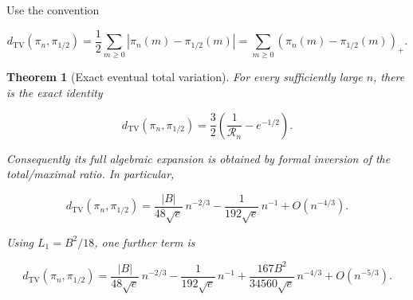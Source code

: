 \documentclass[11pt,letterpaper]{article}
\newtheorem{theorem}{Theorem}[section]
\theoremstyle{remark}
\begin{document}
Use the convention

\[
 d_{\mathrm{TV}}(\pi_n,\pi_{1/2})=\frac12\sum_{m\ge0}|\pi_n(m)-\pi_{1/2}(m)|
                       =\sum_{m\ge0}(\pi_n(m)-\pi_{1/2}(m))_+.
                                                               \tag{D6}\label{tcn:b:D6}
\]

\begin{theorem}[Exact eventual total variation]\label{tcn:b:thm:tv}
For every sufficiently large \(n\), there is the exact
identity

\[
 d_{\mathrm{TV}}(\pi_n,\pi_{1/2})
 =\frac32\left(\frac1{\mathcal R_n}-e^{-1/2}\right).                   \tag{D7}\label{tcn:b:D7}
\]

Consequently its full algebraic expansion is obtained by formal
inversion of the total/maximal ratio. In particular,

\[
 \boxed{\displaystyle
 d_{\mathrm{TV}}(\pi_n,\pi_{1/2})
  =\frac{|B|}{48\sqrt e}\,n^{-2/3}
   -\frac1{192\sqrt e}\,n^{-1}
   +O(n^{-4/3}).}                                            \tag{D8}\label{tcn:b:D8}
\]

Using \(L_1=B^2/18\), one further term is

\[
 d_{\mathrm{TV}}(\pi_n,\pi_{1/2})
  =\frac{|B|}{48\sqrt e}\,n^{-2/3}
   -\frac1{192\sqrt e}\,n^{-1}
   +\frac{167B^2}{34560\sqrt e}\,n^{-4/3}
   +O(n^{-5/3}).                                             \tag{D9}\label{tcn:b:D9}
\]
\end{theorem}
\end{document}
